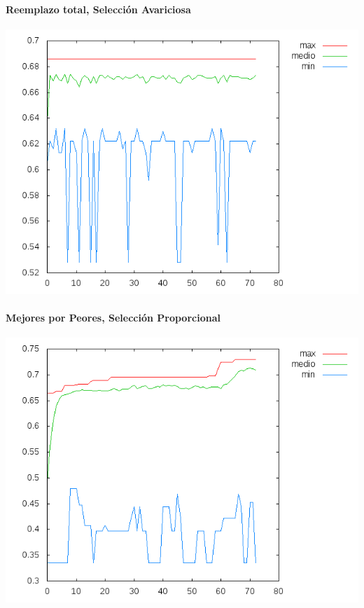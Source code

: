 \documentclass[nochap]{apuntes}
\begin{document}
\paragraph{Reemplazo total, Selección Avariciosa}
\begin{center}
\includegraphics[scale=0.6]{tex/img/g73_p73_ReemplazoTotal_SeleccionAvariciosa_reg11.png}
\end{center}

\paragraph{Mejores por Peores, Selección Proporcional}
\begin{center}
\includegraphics[scale=0.6]{tex/img/g73_p73_MejoresPorPeores_SeleccionProporcionalAlFitness_reg11.png}
\end{center}
\end{document}
